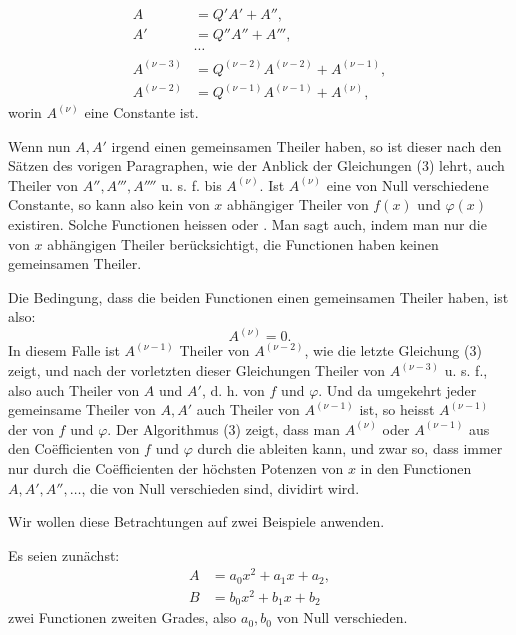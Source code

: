 
\begin{equation}
\begin{aligned}
A&=Q'A'+A'',\\
A'&=Q''A''+A''',\\
&\cdots\\
A^{(\nu-3)}&=Q^{(\nu-2)}A^{(\nu-2)}+A^{(\nu-1)},\\
A^{(\nu-2)}&=Q^{(\nu-1)}A^{(\nu-1)}+A^{(\nu)},
\end{aligned}
\tag{3}
\end{equation}
worin $A^{(\nu)}$ eine Constante ist.

Wenn nun $A,A'$ irgend einen gemeinsamen Theiler haben, so ist dieser nach den Sätzen des vorigen Paragraphen, wie der Anblick der Gleichungen (3) lehrt, auch Theiler von $A'',A''',A''''$ u. s. f. bis $A^{(\nu)}$. Ist $A^{(\nu)}$ eine von Null verschiedene Constante, so kann also kein von $x$ abhängiger Theiler von $f(x)$ und $\varphi(x)$ existiren. Solche Functionen heissen  oder . Man sagt auch, indem man nur die von $x$ abhängigen Theiler berücksichtigt, die Functionen haben keinen gemeinsamen Theiler.

Die Bedingung, dass die beiden Functionen einen gemeinsamen Theiler haben, ist also:
\begin{equation}
 A^{(\nu)}=0.
\tag{4}
\end{equation}
In diesem Falle ist $A^{(\nu-1)}$ Theiler von $A^{(\nu-2)}$, wie die letzte Gleichung (3) zeigt, und nach der vorletzten dieser Gleichungen Theiler von $A^{(\nu-3)}$ u. s. f., also auch Theiler von $A$ und $A'$, d. h. von $f$ und $\varphi$. Und da umgekehrt jeder gemeinsame Theiler von $A,A'$ auch Theiler von $A^{(\nu-1)}$ ist, so heisst $A^{(\nu-1)}$ der  von $f$ und $\varphi$. Der Algorithmus (3) zeigt, dass man $A^{(\nu)}$ oder $A^{(\nu-1)}$ aus den Coëfficienten von $f$ und $\varphi$ durch die  ableiten kann, und zwar so, dass immer nur durch die Coëfficienten der höchsten Potenzen von $x$ in den Functionen $A,A',A'',\ldots$, die von Null verschieden sind, dividirt wird.

Wir wollen diese Betrachtungen auf zwei Beispiele anwenden.

Es seien zunächst:
\begin{equation}
\begin{aligned}
 A&=a_0x^2+a_1x+a_2,\\
 B&=b_0x^2+b_1x+b_2
\end{aligned}
\tag{5}
\end{equation}
zwei Functionen zweiten Grades, also $a_0,b_0$ von Null verschieden.
